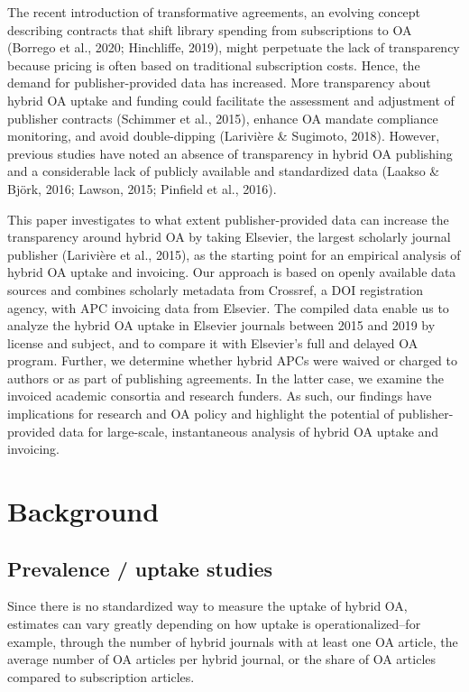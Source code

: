 \documentclass[a4paper,man,floatsintext,longtable,noextraspace,12pt]{apa6}
\begin{document}
The recent introduction of transformative agreements, an evolving
concept describing contracts that shift library spending from
subscriptions to OA (Borrego et al., 2020; Hinchliffe, 2019), might
perpetuate the lack of transparency because pricing is often based on
traditional subscription costs. Hence, the demand for publisher-provided
data has increased. More transparency about hybrid OA uptake and funding
could facilitate the assessment and adjustment of publisher contracts
(Schimmer et al., 2015), enhance OA mandate compliance monitoring, and
avoid double-dipping (Larivière \& Sugimoto, 2018). However, previous
studies have noted an absence of transparency in hybrid OA publishing
and a considerable lack of publicly available and standardized data
(Laakso \& Björk, 2016; Lawson, 2015; Pinfield et al., 2016).

This paper investigates to what extent publisher-provided data can
increase the transparency around hybrid OA by taking Elsevier, the
largest scholarly journal publisher (Larivière et al., 2015), as the
starting point for an empirical analysis of hybrid OA uptake and
invoicing. Our approach is based on openly available data sources and
combines scholarly metadata from Crossref, a DOI registration agency,
with APC invoicing data from Elsevier. The compiled data enable us to
analyze the hybrid OA uptake in Elsevier journals between 2015 and 2019
by license and subject, and to compare it with Elsevier's full and
delayed OA program. Further, we determine whether hybrid APCs were
waived or charged to authors or as part of publishing agreements. In the
latter case, we examine the invoiced academic consortia and research
funders. As such, our findings have implications for research and OA
policy and highlight the potential of publisher-provided data for
large-scale, instantaneous analysis of hybrid OA uptake and invoicing.

\hypertarget{background}{%
\section{Background}\label{background}}

\hypertarget{prevalence-uptake-studies}{%
\subsection{Prevalence / uptake
studies}\label{prevalence-uptake-studies}}

Since there is no standardized way to measure the uptake of hybrid OA,
estimates can vary greatly depending on how uptake is
operationalized--for example, through the number of hybrid journals with
at least one OA article, the average number of OA articles per hybrid
journal, or the share of OA articles compared to subscription articles.
\end{document}
